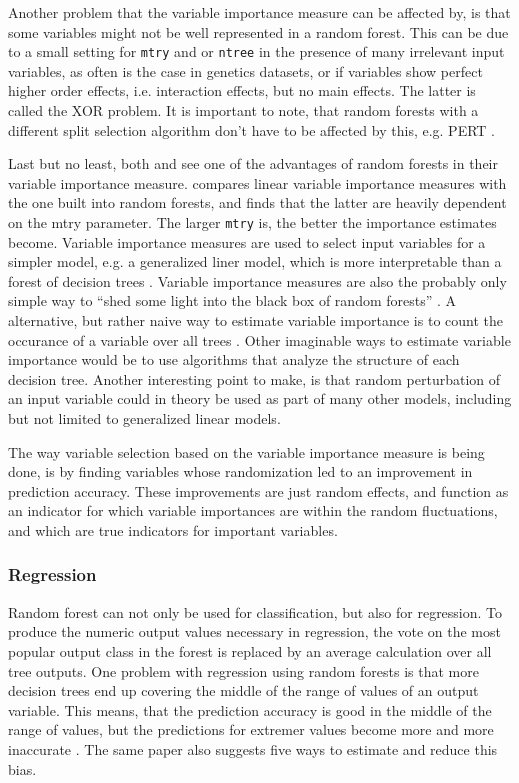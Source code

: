 \documentclass[a4paper,man,12pt,apacite]{apa6} %
\begin{document}
Another problem that the variable importance measure can be affected by,
is that some variables might not be well represented in a random forest.
This can be due to a small setting for \texttt{mtry} and or \texttt{ntree}
in the presence of many irrelevant input variables, as often is the case
in genetics datasets, or if variables show perfect higher order effects,
i.e. interaction effects, but no main effects.
The latter is called the XOR problem.
It is important to note, that random forests with a different split selection
algorithm don't have to be affected by this, e.g. PERT \cite{cutler2001pert}.

Last but no least, both \cite{strobl2009introduction} and
\cite{gromping2009variable} see one of the advantages of random forests in
their variable importance measure.
\cite{gromping2009variable} compares linear variable importance measures
with the one built into random forests, and finds that the latter are
heavily dependent on the mtry parameter.
The larger \texttt{mtry} is, the better the importance estimates become.
Variable importance measures are used to select input variables for a simpler
model, e.g. a generalized liner model, which is more interpretable than a
forest of decision trees \cite{strobl2009introduction}.
Variable importance measures are also the probably only simple way to
“shed some light into the black box of random forests”
\cite{gromping2009variable}.
A alternative, but rather naive way to estimate variable importance is to count
the occurance of a variable over all trees \cite{strobl2009introduction}.
Other imaginable ways to estimate variable importance would be to use
algorithms that analyze the structure of each decision tree.
Another interesting point to make, is that random perturbation of an input
variable could in theory be used as part of many other models, including but
not limited to generalized linear models.

The way variable selection based on the variable importance measure is
being done, is by finding variables whose randomization led to an improvement
in prediction accuracy.
These improvements are just random effects, and function as an indicator
for which variable importances are within the random fluctuations,
and which are true indicators for important variables.

\subsubsection{Regression}
Random forest can not only be used for classification, but also for regression.
To produce the numeric output values necessary in regression,
the vote on the most popular output class in the forest is replaced by an
average calculation over all tree outputs.
One problem with regression using random forests is that more decision trees
end up covering the middle of the range of values of an output variable.
This means, that the prediction accuracy is good in the middle of the range
of values, but the predictions for extremer values become more and more
inaccurate \cite{zhang2012bias}.
The same paper also suggests five ways to estimate and reduce this bias.
\end{document}
